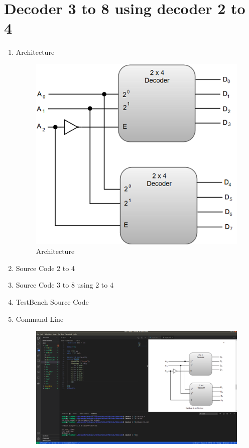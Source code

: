 \documentclass{class}
\begin{document}
\section{Decoder 3 to 8 using decoder 2 to 4}
\begin{enumerate}
    \item Architecture
    \begin{figure}[H]
        \centering
        \includegraphics[width=1\linewidth]{gambar/decoders3.png}
        \caption{Architecture}
        \label{Architecture}
        \end{figure}
    \item Source Code 2 to 4
       
    \item Source Code 3 to 8 using 2 to 4
            
    \item TestBench Source Code
    
    \item Command Line
    \begin{figure}[H]
        \centering
        \includegraphics[width=1\linewidth]{gambar/cmd38.png}

\end{figure}
\end{enumerate}
\end{document}
